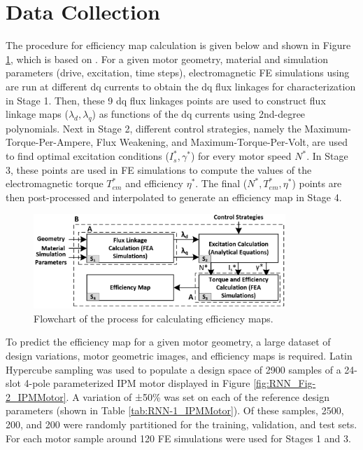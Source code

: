 \section{Data Collection}\label{RNN:3_dataCollection}

The procedure for efficiency map calculation is given below and shown in Figure \ref{fig:RNN_Fig-1_flowchart_effMaps}, which is based on \cite{mohammadi2017computational}. For a given motor geometry, material and simulation parameters (drive, excitation, time steps), electromagnetic FE simulations using \cite{mentor_motorsolve} are run at different dq currents to obtain the dq flux linkages for characterization in Stage 1. Then, these 9 dq flux linkages points are used to construct flux linkage maps ($\lambda_d,\lambda_q$) as functions of the dq currents using 2nd-degree polynomials. Next in Stage 2, different control strategies, namely the Maximum-Torque-Per-Ampere, Flux Weakening, and Maximum-Torque-Per-Volt, are used to find optimal excitation conditions ($I_s^*,\gamma^*$) for every motor speed $N^*$. In Stage 3, these points are used in FE simulations to compute the values of the electromagnetic torque $T_{em}^*$ and efficiency $\eta^*$. The final ($N^*,T_{em}^*,\eta^*$) points are then post-processed and interpolated to generate an efficiency map in Stage 4.

\begin{figure}[h!]
    \centering
    \includegraphics[width=0.85\textwidth]{Figures/Chp_RNN/Fig 1.png}
    \caption{Flowchart of the process for calculating efficiency maps.}
    \label{fig:RNN_Fig-1_flowchart_effMaps}
\end{figure}

To predict the efficiency map for a given motor geometry, a large dataset of design variations, motor geometric images, and efficiency maps is required. Latin Hypercube sampling \parencite{mckay2000comparison} was used to populate a design space of 2900 samples of a 24-slot 4-pole parameterized IPM motor displayed in Figure \ref{fig:RNN_Fig-2_IPMMotor}. A variation of ±50\% was set on each of the reference design parameters (shown in Table \ref{tab:RNN-1_IPMMotor}). Of these samples, 2500, 200, and 200 were randomly partitioned for the training, validation, and test sets. For each motor sample around 120 FE simulations were used for Stages 1 and 3.

